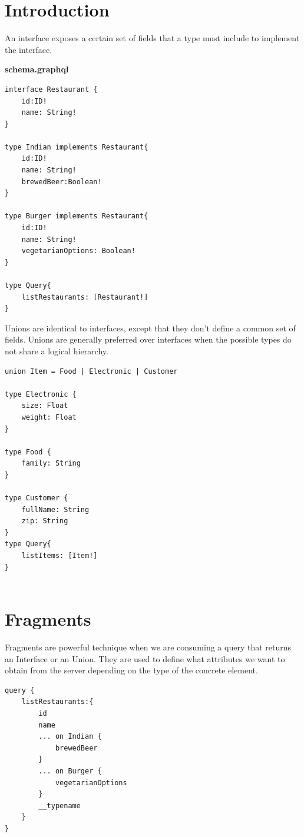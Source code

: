 \documentclass[]{book}
\begin{document}
\section{Introduction}\label{introduction-3}

An interface exposes a certain set of fields that a type must include to
implement the interface.

\textbf{schema.graphql}

\begin{verbatim}
interface Restaurant {
    id:ID!
    name: String!
}

type Indian implements Restaurant{
    id:ID!
    name: String!
    brewedBeer:Boolean!
}

type Burger implements Restaurant{
    id:ID!
    name: String!
    vegetarianOptions: Boolean!
}

type Query{
    listRestaurants: [Restaurant!]
}
\end{verbatim}

Unions are identical to interfaces, except that they don't define a
common set of fields. Unions are generally preferred over interfaces
when the possible types do not share a logical hierarchy.

\begin{verbatim}
union Item = Food | Electronic | Customer

type Electronic {
    size: Float
    weight: Float
}

type Food {
    family: String
}

type Customer {
    fullName: String
    zip: String
}
type Query{
    listItems: [Item!]
}
 
\end{verbatim}

\section{Fragments}\label{fragments}

Fragments are powerful technique when we are consuming a query that
returns an Interface or an Union. They are used to define what
attributes we want to obtain from the server depending on the type of
the concrete element.

\begin{verbatim}
query {
    listRestaurants:{
        id
        name
        ... on Indian {
            brewedBeer
        }
        ... on Burger {
            vegetarianOptions
        }
        __typename
    }
}  
\end{verbatim}
\end{document}
